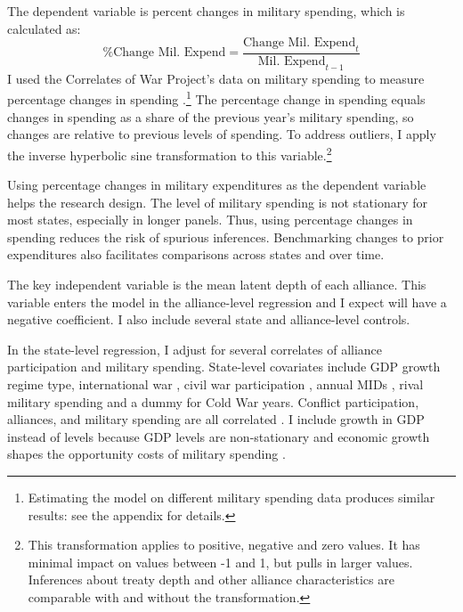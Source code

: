 \documentclass[12pt]{article}
\begin{document}
The dependent variable is percent changes in military spending, which is calculated as:
\begin{equation}
\mbox{\% Change Mil. Expend} = \frac{ \mbox{Change Mil. Expend}_t }{ \mbox{Mil. Expend}_{t-1} }
\end{equation} 
I used the Correlates of War Project's data on military spending to measure percentage changes in spending \citep{SingerCINC1988}.\footnote{Estimating the model on different military spending data produces similar results: see the appendix for details.} 
The percentage change in spending equals changes in spending as a share of the previous year's military spending, so changes are relative to previous levels of spending. 
To address outliers, I apply the inverse hyperbolic sine transformation to this variable.\footnote{This transformation applies to positive, negative and zero values. It has minimal impact on values between -1 and 1, but pulls in larger values. Inferences about treaty depth and other alliance characteristics are comparable with and without the transformation.}


Using percentage changes in military expenditures as the dependent variable helps the research design. 
The level of military spending is not stationary for most states, especially in longer panels. 
Thus, using percentage changes in spending reduces the risk of spurious inferences.
Benchmarking changes to prior expenditures also facilitates comparisons across states and over time. 


The key independent variable is the mean latent depth of each alliance. 
This variable enters the model in the alliance-level regression and I expect will have a negative coefficient. 
I also include several state and alliance-level controls. 


In the state-level regression, I adjust for several correlates of alliance participation and military spending. 
State-level covariates include GDP growth \citep{Boltetal2018} regime type, international war \citep{Reiteretal2016}, civil war participation \citep{SarkeesWayman2010}, annual MIDs \citep{Gibleretal2016}, rival military spending \citep{ThompsonDreyer2012} and a dummy for Cold War years.
Conflict participation, alliances, and military spending are all correlated \citep{SeneseVasquez2008}.
I include growth in GDP instead of levels because GDP levels are non-stationary and economic growth shapes the opportunity costs of military spending \citep{Kimball2010, Zielinskietal2017}.  
\end{document}
